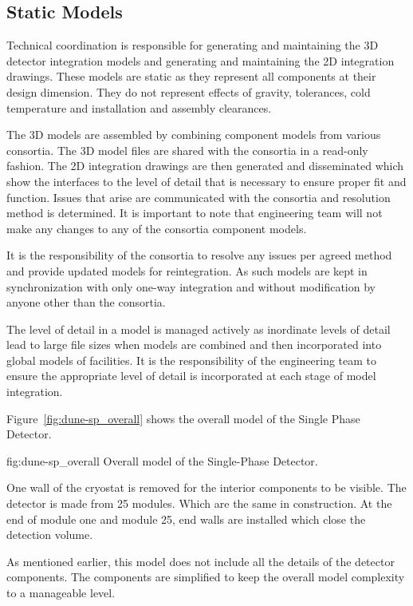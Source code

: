 \subsection{Static Models}
\label{sec:fdsp-coord-integ-static}
Technical coordination is responsible for generating and maintaining
the 3D detector integration models and generating and maintaining the
2D integration drawings. These models are static as they represent all
components at their design dimension. They do not represent effects of
gravity, tolerances, cold temperature and installation and assembly
clearances.

The 3D models are assembled by combining component models from various
consortia. The 3D model files are shared with the consortia in a
read-only fashion. The 2D integration drawings are then generated and
disseminated which show the interfaces to the level of detail that is
necessary to ensure proper fit and function. Issues that arise are
communicated with the consortia and resolution method is
determined. It is important to note that  engineering team
will not make any changes to any of the consortia component models.

It is the responsibility of the consortia to resolve any issues per
agreed method and provide updated models for reintegration. As such
models are kept in synchronization with only one-way integration and
without modification by anyone other than the consortia.

The level of detail in a model is managed actively as inordinate
levels of detail lead to large file sizes when models are combined and
then incorporated into global models of facilities. It is the
responsibility of the  engineering team to ensure the
appropriate level of detail is incorporated at each stage of model
integration.

Figure~\ref{fig:dune-sp_overall} shows the overall model of the Single Phase Detector.
\begin{dunefigure}{fig:dune-sp_overall}
  {Overall model of the Single-Phase Detector.}
\end{dunefigure}
One wall of the cryostat is removed for the interior components to be
visible. The detector is made from 25 modules. Which are the same in
construction. At the end of module one and module 25, end walls are
installed which close the detection volume.

As mentioned earlier, this model does not include all the details of
the detector components. The components are simplified to keep the
overall model complexity to a manageable level.

